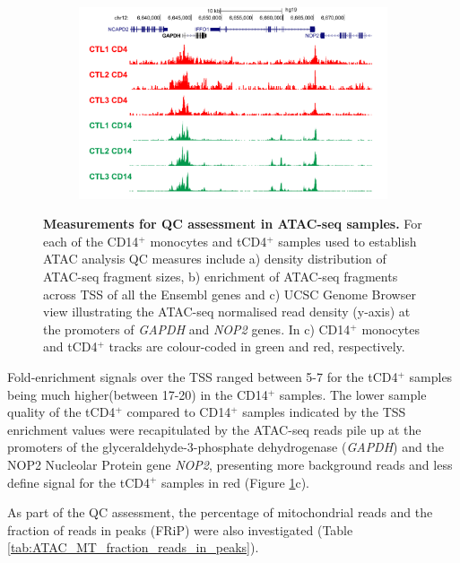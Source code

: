 \begin{figure}[htbp]
\begin{subfigure}[b]{0.6\textwidth}
\centering
\includegraphics[width=\textwidth]{./Results1/pdfs/ATAC_Core_CD4_CD14_fresh_GAPDH}
\caption{\textbf{}} %
\end{subfigure}
\caption[Measurements for QC assessment in ATAC-seq samples]{\textbf{Measurements for QC assessment in ATAC-seq samples.} For each of the CD14$^+$ monocytes and tCD4$^+$ samples used to establish ATAC analysis QC measures include a) density distribution of ATAC-seq fragment sizes, b) enrichment of ATAC-seq fragments across TSS of all the Ensembl genes and c) UCSC Genome Browser view illustrating the ATAC-seq normalised read density (y-axis) at the promoters of \textit{GAPDH} and \textit{NOP2} genes. In c) CD14$^+$ monocytes and tCD4$^+$ tracks are colour-coded in green and red, respectively.}
\label{figure:QC_ATAC}
\end{figure} 


Fold-enrichment signals over the TSS ranged between 5-7 for the tCD4$^+$ samples being much higher(between 17-20) in the CD14$^+$ samples. The lower sample quality of the tCD4$^+$ compared to CD14$^+$ samples indicated by the TSS enrichment values were recapitulated by the ATAC-seq reads pile up at the promoters of the glyceraldehyde-3-phosphate dehydrogenase (\textit{GAPDH}) and the NOP2 Nucleolar Protein gene \textit{NOP2}, presenting more background reads and less define signal for the tCD4$^+$ samples in red (Figure \ref{figure:QC_ATAC}c).
	
As part of the QC assessment, the percentage of mitochondrial reads and the fraction of reads in peaks (FRiP) were also investigated (Table \ref{tab:ATAC_MT_fraction_reads_in_peaks}). 

